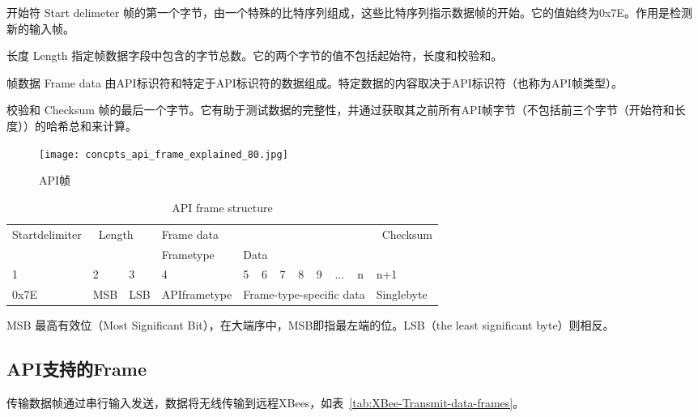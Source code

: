 开始符 Start delimeter 帧的第一个字节，由一个特殊的比特序列组成，这些比特序列指示数据帧的开始。它的值始终为0x7E。作用是检测新的输入帧。

长度 Length 指定帧数据字段中包含的字节总数。它的两个字节的值不包括起始符，长度和校验和。

帧数据 Frame data 由API标识符和特定于API标识符的数据组成。特定数据的内容取决于API标识符（也称为API帧类型）。

校验和 Checksum 帧的最后一个字节。它有助于测试数据的完整性，并通过获取其之前所有API帧字节（不包括前三个字节（开始符和长度））的哈希总和来计算。

\begin{figure}[htbp]
    \centering
    \texttt{[image: concpts\_api\_frame\_explained\_80.jpg]}
    \caption{API帧}
    \label{fig:api-frame}
\end{figure}

\begin{table}[htbp]
    \centering
    \begin{tabular}{l|l|l|l|l|l|l|l|l|l|l|l} 
    \toprule
    Startdelimiter & \multicolumn{2}{l|}{~Length} & \multicolumn{8}{l|}{Frame data}                              & ~Checksum   \\ 
    \cline{4-11}
                   & \multicolumn{2}{l|}{}        & Frametype    & \multicolumn{7}{l|}{Data}                     &             \\ 
    \midrule
    1              & 2   & 3                      & 4            & 5 & 6 & 7 & 8 & 9 & ... & n                   & n+1         \\ 
    \cline{1-3}\cline{5-12}
    0x7E           & MSB & LSB                    & APIframetype & \multicolumn{7}{l|}{Frame-type-specific data} & Singlebyte  \\
    \bottomrule
    \end{tabular}
    \caption{API frame structure}
    \label{tab:API-frame-structure}
\end{table}

MSB 最高有效位（Most Significant Bit），在大端序中，MSB即指最左端的位。LSB（the least significant byte）则相反。

\subsection{API支持的Frame}

传输数据帧通过串行输入发送，数据将无线传输到远程XBees，如表~\ref{tab:XBee-Transmit-data-frames}。

